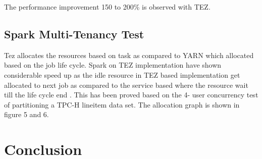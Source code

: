 \documentclass[9pt,twocolumn,twoside]{../../styles/osajnl}
\begin{document}
 
 The performance improvement   150 to 200\% is observed with TEZ.
 
 
  \subsection{Spark Multi-Tenancy Test}
 
   Tez allocates the resources based on task as compared to YARN which allocated based on the job life cycle. 
   Spark on TEZ implementation have shown considerable speed up as the idle resource in TEZ based implementation get allocated 
   to next job as compared to the service based where the resource wait till the life cycle end . This has been proved based 
   on the 4- user concurrency test of partitioning a TPC-H lineitem data set. The allocation graph is shown in figure 5 and 6.
   

  \begin{figure}[htbp]
  \centering
  \caption{\cite{www-spark1}}
  \centering
  \end{figure}
 
 
  \section{Conclusion} 
\end{document}
